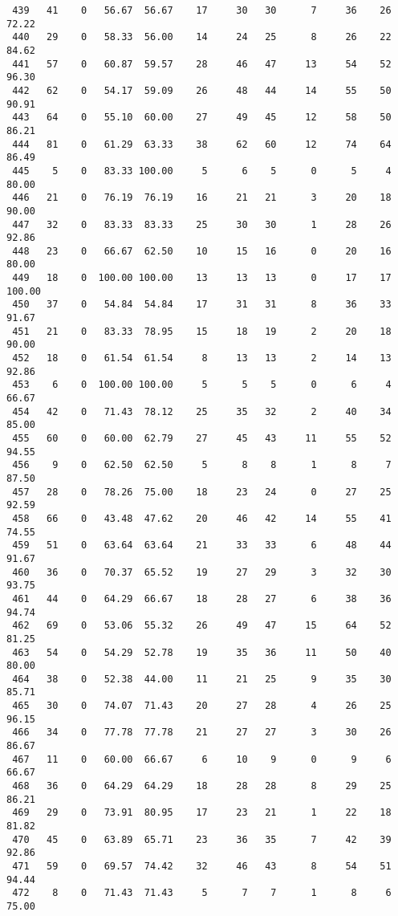 \begin{verbatim}
 439   41    0   56.67  56.67    17     30   30      7     36    26    72.22
 440   29    0   58.33  56.00    14     24   25      8     26    22    84.62
 441   57    0   60.87  59.57    28     46   47     13     54    52    96.30
 442   62    0   54.17  59.09    26     48   44     14     55    50    90.91
 443   64    0   55.10  60.00    27     49   45     12     58    50    86.21
 444   81    0   61.29  63.33    38     62   60     12     74    64    86.49
 445    5    0   83.33 100.00     5      6    5      0      5     4    80.00
 446   21    0   76.19  76.19    16     21   21      3     20    18    90.00
 447   32    0   83.33  83.33    25     30   30      1     28    26    92.86
 448   23    0   66.67  62.50    10     15   16      0     20    16    80.00
 449   18    0  100.00 100.00    13     13   13      0     17    17   100.00
 450   37    0   54.84  54.84    17     31   31      8     36    33    91.67
 451   21    0   83.33  78.95    15     18   19      2     20    18    90.00
 452   18    0   61.54  61.54     8     13   13      2     14    13    92.86
 453    6    0  100.00 100.00     5      5    5      0      6     4    66.67
 454   42    0   71.43  78.12    25     35   32      2     40    34    85.00
 455   60    0   60.00  62.79    27     45   43     11     55    52    94.55
 456    9    0   62.50  62.50     5      8    8      1      8     7    87.50
 457   28    0   78.26  75.00    18     23   24      0     27    25    92.59
 458   66    0   43.48  47.62    20     46   42     14     55    41    74.55
 459   51    0   63.64  63.64    21     33   33      6     48    44    91.67
 460   36    0   70.37  65.52    19     27   29      3     32    30    93.75
 461   44    0   64.29  66.67    18     28   27      6     38    36    94.74
 462   69    0   53.06  55.32    26     49   47     15     64    52    81.25
 463   54    0   54.29  52.78    19     35   36     11     50    40    80.00
 464   38    0   52.38  44.00    11     21   25      9     35    30    85.71
 465   30    0   74.07  71.43    20     27   28      4     26    25    96.15
 466   34    0   77.78  77.78    21     27   27      3     30    26    86.67
 467   11    0   60.00  66.67     6     10    9      0      9     6    66.67
 468   36    0   64.29  64.29    18     28   28      8     29    25    86.21
 469   29    0   73.91  80.95    17     23   21      1     22    18    81.82
 470   45    0   63.89  65.71    23     36   35      7     42    39    92.86
 471   59    0   69.57  74.42    32     46   43      8     54    51    94.44
 472    8    0   71.43  71.43     5      7    7      1      8     6    75.00

\end{verbatim}
